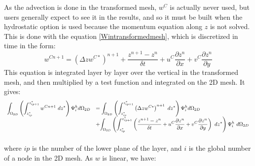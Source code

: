 As the advection is done in the transformed mesh, $w^C$ is actually never used,
but users generally expect to see it in the results, and so it must be built
when the hydrostatic option is used because the momentum equation along $z$
is not solved. This is done with the equation \ref{Wintransformedmesh},
which is discretized in time in the form:%
\begin{equation}
w^{Cn+1}=(\Delta zw^{C\ast})^{n+1}+\dfrac{z^{n+1}-z^{n}}{\delta t}+u^C\dfrac
{\partial z^{n}}{\partial x}+v^C\dfrac{\partial z^{n}}{\partial y} \label{WWSTAR}%
\end{equation}
This equation is integrated layer by layer over the vertical in the
transformed mesh, and then multiplied by a test function and integrated on the
2D mesh. It gives:%
\begin{equation}
\begin{array}{ll}
\displaystyle{\int_{\Omega_{2D}}}\left(\int_{z_{ip}^{\ast}}^{z_{ip+1}^{\ast}}
w^{Cn+1}~dz^{\ast}\right)  \Psi_{i}^{h}d\Omega_{2D} & =\displaystyle{\int_{\Omega_{2D}}}\left(
\int_{z_{ip}^{\ast}}^{z_{ip+1}^{\ast}}\left(  \Delta zw^{C\ast}\right)
^{n+1}~dz^{\ast}\right)  \Psi_{i}^{h}d\Omega_{2D}\\\bigskip
& +\displaystyle{\int_{\Omega_{2D}}}\left(  \int_{z_{ip}^{\ast}}^{z_{ip+1}^{\ast}}\left(
\dfrac{z^{n+1}-z^{n}}{\delta t}+u^C\dfrac{\partial z^{n}}{\partial x}
+v^C\dfrac{\partial z^{n}}{\partial y}\right)  ~dz^{\ast}\right)
\Psi_{i}^{h}~d\Omega_{2D}
\end{array}
\end{equation}
where $ip$ is the number of the lower plane of the layer, and $i$ is the
global number of a node in the 2D mesh. As $w$ is linear, we have:%


